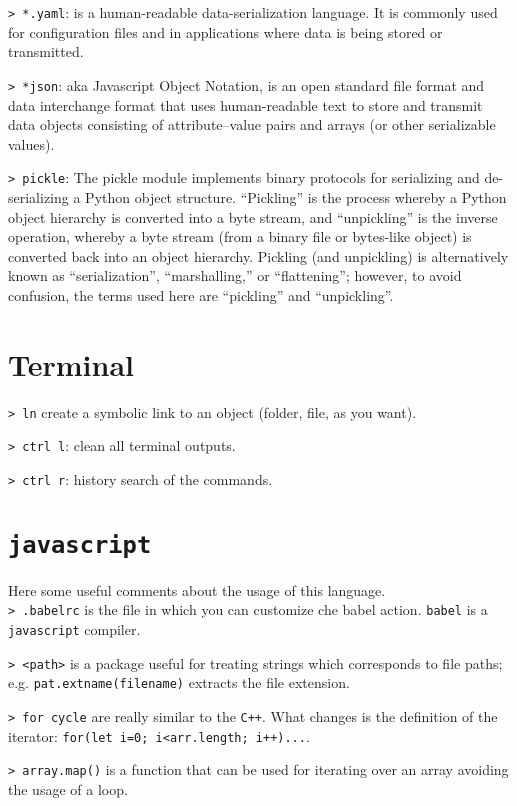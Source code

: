 \documentclass[11pt]{article}
\newcommand{\cmd}[1]{\colorbox{light-gray}{\textcolor{gio}{\texttt{#1}}}}
\begin{document}
\begin{multicols}{2}
\cmd{> *.yaml}: is a human-readable data-serialization language. It is commonly 
used for configuration files and in applications where data is being stored or 
transmitted.

\cmd{> *json}: aka Javascript Object Notation, is an open standard file format 
and data interchange format that uses human-readable text to store and transmit
 data objects consisting of attribute–value pairs and arrays (or other serializable values).

\cmd{> pickle}: The pickle module implements binary protocols for serializing 
and de-serializing a Python object structure. “Pickling” is the process whereby 
a Python object hierarchy is converted into a byte stream, and “unpickling” is 
the inverse operation, whereby a byte stream (from a binary file or bytes-like object) 
is converted back into an object hierarchy. Pickling (and unpickling) is 
alternatively known as “serialization”, “marshalling,” or “flattening”; however, 
to avoid confusion, the terms used here are “pickling” and “unpickling”.

\section{Terminal}

\cmd{> ln} create a symbolic link to an object (folder, file, as you want).

\cmd{> ctrl l}: clean all terminal outputs.

\cmd{> ctrl r}: history search of the commands.

\section{\texttt{javascript}}

Here some useful comments about the usage of this language. \\

\cmd{> .babelrc} is the file in which you can customize che babel action. 
\texttt{babel} is a \texttt{javascript} compiler.

\cmd{> <path>} is a package useful for treating strings which corresponds to 
file paths; e.g. \texttt{pat.extname(filename)} extracts the file extension.

\cmd{> for cycle} are really similar to the \texttt{C++}. What changes is the 
definition of the iterator: \texttt{for(let i=0; i<arr.length; i++){...}}.

\cmd{> array.map()} is a function that can be used for iterating over an array 
avoiding the usage of a loop.


\end{multicols}
\end{document}
